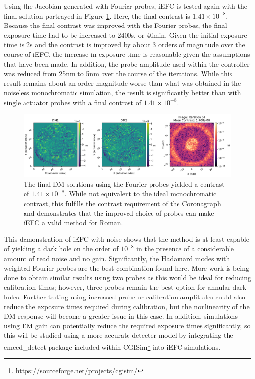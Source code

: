 \documentclass[12pt]{spieman}  %
\begin{document}
\begin{spacing}{2}
Using the Jacobian generated with Fourier probes, iEFC is tested again with the final solution portrayed in Figure \ref{fig:spc-band4b-fourier-modes}. Here, the final contrast is $1.41\times10^{-8}$. Because the final contrast was improved with the Fourier probes, the final exposure time had to be increased to 2400s, or 40min. Given the initial exposure time is 2s and the contrast is improved by about 3 orders of magnitude over the course of iEFC, the increase in exposure time is reasonable given the assumptions that have been made. In addition, the probe amplitude used within the controller was reduced from 25nm to 5nm over the course of the iterations. While this result remains about an order magnitude worse than what was obtained in the noiseless monochromatic simulation, the result is significantly better than with single actuator probes with a final contrast of $1.41\times10^{-8}$. 

\begin{figure}[h]
    \centering
    \includegraphics[scale=0.5]{figs-spc-band4b/had_modes_3fourier.pdf}
    \caption{The final DM solutions using the Fourier probes yielded a contrast of $1.41\times10^{-8}$. While not equivalent to the ideal monochromatic contrast, this fulfills the contrast requirement of the Coronagraph and demonstrates that the improved choice of probes can make iEFC a valid method for Roman.}
    \label{fig:spc-band4b-fourier-modes}
\end{figure}

This demonstration of iEFC with noise shows that the method is at least capable of yielding a dark hole on the order of $10^{-8}$ in the presence of a considerable amount of read noise and no gain. Significantly, the Hadamard modes with weighted Fourier probes are the best combination found here. More work is being done to obtain similar results using two probes as this would be ideal for reducing calibration times; however, three probes remain the best option for annular dark holes. Further testing using increased probe or calibration amplitudes could also reduce the exposure times required during calibration, but the nonlinearity of the DM response will become a greater issue in this case. In addition, simulations using EM gain can potentially reduce the required exposure times significantly, so this will be studied using a more accurate detector model by integrating the emccd\_detect package included within CGISim\footnote{\href{https://sourceforge.net/projects/cgisim/}{https://sourceforge.net/projects/cgisim/}} into iEFC simulations. 


\end{spacing}
\end{document}
